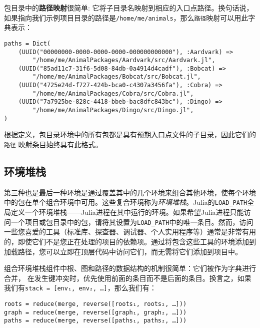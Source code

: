 包目录中的\textbf{路径映射}很简单: 它将子目录名映射到相应的入口点路径。换句话说，如果指向我们示例项目目录的路径是\texttt{/home/me/animals}，那么\texttt{路径}映射可以用此字典表示：




\begin{verbatim}
paths = Dict(
    (UUID("00000000-0000-0000-0000-000000000000"), :Aardvark) =>
        "/home/me/AnimalPackages/Aardvark/src/Aardvark.jl",
    (UUID("85ad11c7-31f6-5d08-84db-0a4914d4cadf"), :Bobcat) =>
        "/home/me/AnimalPackages/Bobcat/src/Bobcat.jl",
    (UUID("4725e24d-f727-424b-bca0-c4307a3456fa"), :Cobra) =>
        "/home/me/AnimalPackages/Cobra/src/Cobra.jl",
    (UUID("7a7925be-828c-4418-bbeb-bac8dfc843bc"), :Dingo) =>
        "/home/me/AnimalPackages/Dingo/src/Dingo.jl",
)
\end{verbatim}



根据定义，包目录环境中的所有包都是具有预期入口点文件的子目录，因此它们的\texttt{路径} 映射条目始终具有此格式。



\hypertarget{14356834175019870606}{}


\subsection{环境堆栈}



第三种也是最后一种环境是通过覆盖其中的几个环境来组合其他环境，使每个环境中的包在单个组合环境中可用。这些复合环境称为\emph{环境堆栈}。Julia的\texttt{LOAD\_PATH}全局定义一个环境堆栈——Julia进程在其中运行的环境。如果希望Julia进程只能访问一个项目或包目录中的包，请将其设置为\texttt{LOAD\_PATH}中的唯一条目。然而，访问一些您喜爱的工具（标准库、探查器、调试器、个人实用程序等）通常是非常有用的，即使它们不是您正在处理的项目的依赖项。通过将包含这些工具的环境添加到加载路径，您可以立即在顶层代码中访问它们，而无需将它们添加到项目中。



组合环境堆栈组件中根、图和路径的数据结构的机制很简单：它们被作为字典进行合并， 在发生键冲突时，优先使用前面的条目而不是后面的条目。换言之，如果我们有\texttt{stack = [env₁, env₂, …]}，那么我们有：




\begin{verbatim}
roots = reduce(merge, reverse([roots₁, roots₂, …]))
graph = reduce(merge, reverse([graph₁, graph₂, …]))
paths = reduce(merge, reverse([paths₁, paths₂, …]))
\end{verbatim}



